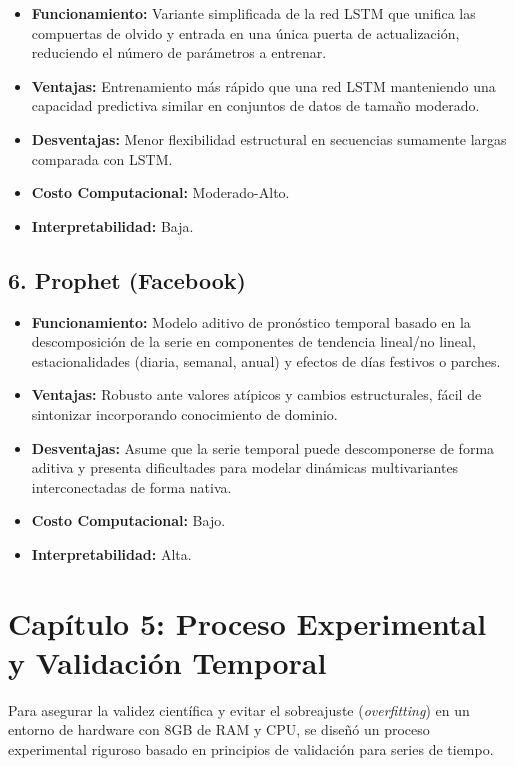 \documentclass[
  spanish,
  12pt,
]{report}
\providecommand{\tightlist}{%
  \setlength{\itemsep}{0pt}\setlength{\parskip}{0pt}}
\begin{document}
\begin{itemize}
\tightlist
\item
  \textbf{Funcionamiento:} Variante simplificada de la red LSTM que
  unifica las compuertas de olvido y entrada en una única puerta de
  actualización, reduciendo el número de parámetros a entrenar.
\item
  \textbf{Ventajas:} Entrenamiento más rápido que una red LSTM
  manteniendo una capacidad predictiva similar en conjuntos de datos de
  tamaño moderado.
\item
  \textbf{Desventajas:} Menor flexibilidad estructural en secuencias
  sumamente largas comparada con LSTM.
\item
  \textbf{Costo Computacional:} Moderado-Alto.
\item
  \textbf{Interpretabilidad:} Baja.
\end{itemize}

\section{6. Prophet (Facebook)}\label{prophet-facebook}

\begin{itemize}
\tightlist
\item
  \textbf{Funcionamiento:} Modelo aditivo de pronóstico temporal basado
  en la descomposición de la serie en componentes de tendencia lineal/no
  lineal, estacionalidades (diaria, semanal, anual) y efectos de días
  festivos o parches.
\item
  \textbf{Ventajas:} Robusto ante valores atípicos y cambios
  estructurales, fácil de sintonizar incorporando conocimiento de
  dominio.
\item
  \textbf{Desventajas:} Asume que la serie temporal puede descomponerse
  de forma aditiva y presenta dificultades para modelar dinámicas
  multivariantes interconectadas de forma nativa.
\item
  \textbf{Costo Computacional:} Bajo.
\item
  \textbf{Interpretabilidad:} Alta.
\end{itemize}

\chapter{Capítulo 5: Proceso Experimental y Validación
Temporal}\label{capuxedtulo-5-proceso-experimental-y-validaciuxf3n-temporal}

Para asegurar la validez científica y evitar el sobreajuste
(\emph{overfitting}) en un entorno de hardware con 8GB de RAM y CPU, se
diseñó un proceso experimental riguroso basado en principios de
validación para series de tiempo.
\end{document}
